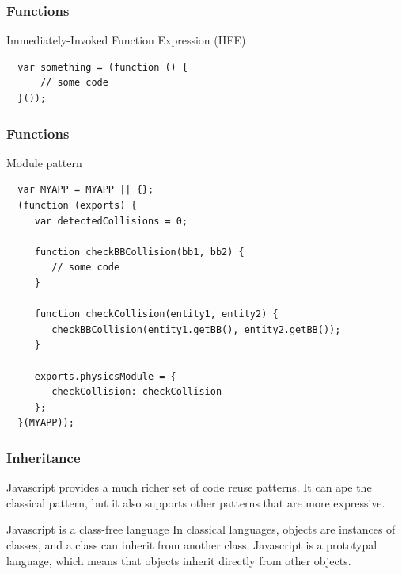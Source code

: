 \begin{frame}[fragile]
  \frametitle{Functions}
  \begin{block}{Immediately-Invoked Function Expression (IIFE)}
  {\scriptsize
  \begin{verbatim}
  var something = (function () {
      // some code
  }());
  \end{verbatim}
  }
  \end{block}
\end{frame}

\begin{frame}[fragile]
  \frametitle{Functions}
  \begin{block}{Module pattern}
  {\tiny
  \begin{verbatim}
  var MYAPP = MYAPP || {};
  (function (exports) {
     var detectedCollisions = 0;

     function checkBBCollision(bb1, bb2) {
        // some code
     }

     function checkCollision(entity1, entity2) {
        checkBBCollision(entity1.getBB(), entity2.getBB());
     }

     exports.physicsModule = {
        checkCollision: checkCollision
     };
  }(MYAPP));
  \end{verbatim}
  }
  \end{block}
\end{frame}

\begin{frame}[fragile]
  \frametitle{Inheritance}

  Javascript provides a much richer set of code reuse patterns. It can ape the classical pattern, but it also supports other patterns that are more expressive.

  \pause

  \begin{block}{Javascript is a class-free language}
    In classical languages, objects are instances of classes, and a class can inherit from another class. Javascript is a prototypal language, which means that objects inherit directly from other objects.
  \end{block}
  
\end{frame}

